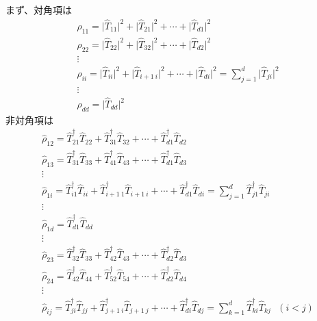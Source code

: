 \documentclass[11pt,a4j,notitlepage]{jreport}
\begin{document}
	まず、対角項は
	\begin{equation*}
		\begin{gathered}
			\hat{\rho}_{11} = \big| \hat{T}_{11} \big|^2 + \big| \hat{T}_{21} \big|^2 + \cdots + \big| \hat{T}_{d1} \big|^2 \\
			\hat{\rho}_{22} = \big| \hat{T}_{22} \big|^2 + \big| \hat{T}_{32} \big|^2 + \cdots + \big| \hat{T}_{d2} \big|^2 \\
			\vdots \\
			\hat{\rho}_{ii} = \big| \hat{T}_{ii} \big|^2 + \big| \hat{T}_{i+1\ i} \big|^2 + \cdots + \big| \hat{T}_{di} \big|^2 = \sum_{j=1}^d \big| \hat{T}_{ji} \big|^2 \\
			\vdots \\
			\hat{\rho}_{dd} = \big| \hat{T}_{dd} \big|^2
		\end{gathered}
	\end{equation*}
	非対角項は
	\begin{equation*}
		\begin{gathered}
			\hat{\rho}_{12} = \hat{T}_{21}^\dagger \hat{T}_{22} + \hat{T}_{31}^\dagger \hat{T}_{32} + \cdots + \hat{T}_{d1}^\dagger \hat{T}_{d2} \\
			\hat{\rho}_{13} = \hat{T}_{31}^\dagger \hat{T}_{33} + \hat{T}_{41}^\dagger \hat{T}_{43} + \cdots + \hat{T}_{d1}^\dagger \hat{T}_{d3} \\
			\vdots \\
			\hat{\rho}_{1i} = \hat{T}_{i1}^\dagger \hat{T}_{ii} + \hat{T}_{i+1\ 1}^\dagger \hat{T}_{i+1\ i} + \cdots + \hat{T}_{d1}^\dagger \hat{T}_{di} = \sum_{j=1}^d \hat{T}_{j1}^\dagger \hat{T}_{ji}\\
			\vdots \\
			\hat{\rho}_{1d} = \hat{T}_{d1}^\dagger \hat{T}_{dd} \\
			\vdots \\
			\hat{\rho}_{23} = \hat{T}_{32}^\dagger \hat{T}_{33} + \hat{T}_{42}^\dagger \hat{T}_{43} + \cdots + \hat{T}_{d2}^\dagger \hat{T}_{d3} \\
			\hat{\rho}_{24} = \hat{T}_{42}^\dagger \hat{T}_{44} + \hat{T}_{52}^\dagger \hat{T}_{54} + \cdots + \hat{T}_{d2}^\dagger \hat{T}_{d4} \\
			\vdots \\
			\hat{\rho}_{ij} = \hat{T}_{ji}^\dagger \hat{T}_{jj} + \hat{T}_{j+1\ i}^\dagger \hat{T}_{j+1\ j} + \cdots + \hat{T}_{di}^\dagger \hat{T}_{dj} = \sum_{k=1}^d \hat{T}_{ki}^\dagger \hat{T}_{kj}\ \ \ (i<j)
		\end{gathered}
	\end{equation*}
\end{document}
